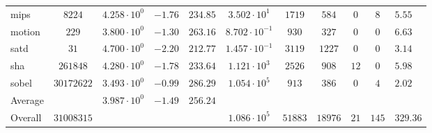 \begin{tabular}{|l|c|HHc|c|c|c|c|cH|}
mips          & $ 8224     $ & $ 4.258 \cdot 10^{0} $ & $ -1.76 $ & $ 234.85 $ & $ 3.502 \cdot 10^{1}  $ & $ 1719  $ & $ 584   $ & $ 0   $ & $ 8   $ & $ 5.55    $ \\
motion        & $ 229      $ & $ 3.800 \cdot 10^{0} $ & $ -1.30 $ & $ 263.16 $ & $ 8.702 \cdot 10^{-1} $ & $ 930   $ & $ 327   $ & $ 0   $ & $ 0   $ & $ 6.63    $ \\
satd          & $ 31       $ & $ 4.700 \cdot 10^{0} $ & $ -2.20 $ & $ 212.77 $ & $ 1.457 \cdot 10^{-1} $ & $ 3119  $ & $ 1227  $ & $ 0   $ & $ 0   $ & $ 3.14    $ \\
sha           & $ 261848   $ & $ 4.280 \cdot 10^{0} $ & $ -1.78 $ & $ 233.64 $ & $ 1.121 \cdot 10^{3}  $ & $ 2526  $ & $ 908   $ & $ 12  $ & $ 0   $ & $ 5.98    $ \\
sobel         & $ 30172622 $ & $ 3.493 \cdot 10^{0} $ & $ -0.99 $ & $ 286.29 $ & $ 1.054 \cdot 10^{5}  $ & $ 913   $ & $ 386   $ & $ 0   $ & $ 4   $ & $ 2.02    $ \\
\hline
Average       & $          $ & $ 3.987 \cdot 10^{0} $ & $ -1.49 $ & $ 256.24 $ & $                     $ & $       $ & $       $ & $     $ & $     $ & $         $ \\
\hline
Overall       & $ 31008315 $ & $                    $ & $       $ & $        $ & $ 1.086 \cdot 10^{5}  $ & $ 51883 $ & $ 18976 $ & $ 21  $ & $ 145 $ & $ 329.36  $ \\
\hline
\end{tabular}
